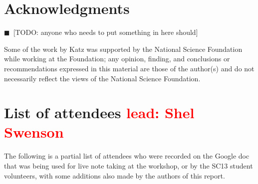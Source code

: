 \documentclass[11pt, oneside]{amsart}
\newcommand{\todo}[1]{{\color{blue}$\blacksquare$~\textsf{[TODO: #1]}}}
\newcommand{\note}[1]{ {\textcolor{red}    { #1 }}}
\begin{document}
\section*{Acknowledgments}

\todo{anyone who needs to put something in here should}

Some of the work by Katz was
supported by the National Science Foundation while working at the
Foundation; any opinion, finding, and conclusions or recommendations
expressed in this material are those of the author(s) and do not
necessarily reflect the views of the National Science Foundation.


\appendix
\section{List of attendees \note{lead: Shel Swenson}}


The following is a partial list of attendees who were recorded on the
Google doc~\cite{WSSSPE1-google-notes} that was being used for live note taking at the workshop, or by the SC13 student volunteers, with some additions also made by the authors of this report.
\end{document}
